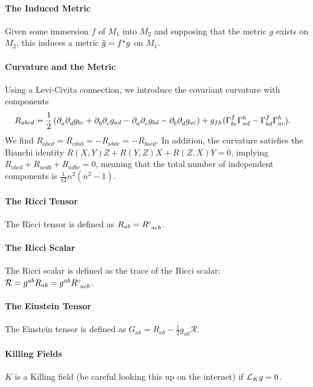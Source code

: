 \paragraph{The Induced Metric}
Given some immersion $f$ of $M_{1}$ into $M_{2}$ and supposing that the metric $g$ exists on $M_{2}$, this induces a metric $\tilde{g} = f^{\star}g$ on $M_{1}$.

\paragraph{Curvature and the Metric}
Using a Levi-Civita connection, we introduce the covariant curvature with components
\begin{align*}
R_{abcd} &= \frac{1}{2}\left(\del{a}{\del{d}{g_{bc}}} + \del{b}{\del{c}{g_{ad}}} - \del{a}{\del{c}{g_{bd}}} - \del{b}{\del{d}{g_{ac}}}\right) + g_{fh}(\chris{f}{b}{c}\chris{h}{a}{d} - \chris{f}{b}{d}\chris{h}{a}{c}).
\end{align*}
We find $R_{abcd} = R_{cdab} = -R_{abdc} = -R_{bacd}$. In addition, the curvature satisfies the Bianchi identity $R(X, Y)Z + R(Y, Z)X + R(Z, X)Y = 0$, implying $R_{abcd} + R_{acdb} + R_{adbc} = 0$, meaning that the total number of independent components is $\frac{1}{12}n^{2}(n^{2} - 1)$.

\paragraph{The Ricci Tensor}
The Ricci tensor is defined as $R_{ab} = \tensor{R}{^{c}_{acb}}$.

\paragraph{The Ricci Scalar}
The Ricci scalar is defined as the trace of the Ricci scalar: $\mathcal{R} = g^{ab}R_{ab} = g^{ab}\tensor{R}{^{c}_{acb}}$.

\paragraph{The Einstein Tensor}
The Einstein tensor is defined as $G_{ab} = R_{ab} - \frac{1}{2}g_{ab}\mathcal{R}$.

\paragraph{Killing Fields}
$K$ is a Killing field (be careful looking this up on the internet) if $\mathcal{L}_{K}g = 0$.

